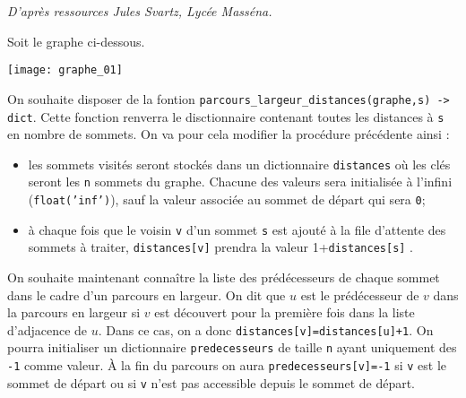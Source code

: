 \begin{flushright}
\textit{D'après ressources Jules Svartz, Lycée Masséna.}
\end{flushright}

Soit le graphe ci-dessous. 

\begin{center}
\texttt{[image: graphe\_01]}
\end{center}



%

On souhaite disposer de la fontion  \texttt{parcours\_largeur\_distances(graphe,s) -> dict}. Cette fonction renverra le disctionnaire contenant toutes les distances à \texttt{s} en nombre de sommets. On va pour cela modifier la procédure précédente ainsi :
\begin{itemize}
\item  les sommets visités seront stockés dans un dictionnaire \texttt{distances} où les clés seront les \texttt{n} sommets du graphe. Chacune des valeurs sera initialisée à l'infini (\texttt{float('inf')}), sauf la valeur associée au sommet de départ qui sera \texttt{0};
\item à chaque fois que le voisin \texttt{v} d'un sommet \texttt{s} est ajouté à la file d'attente des sommets à traiter, \texttt{distances[v]} prendra la valeur 1+\texttt{distances[s]} .
\end{itemize}

On souhaite maintenant connaître la liste des prédécesseurs de chaque sommet dans le cadre d'un parcours en largeur. On dit que $u$ est le prédécesseur de $v$ dans la parcours en largeur si $v$ est découvert pour la première fois dans la liste d'adjacence de $u$. Dans ce cas, on a donc \texttt{distances[v]=distances[u]+1}.  On pourra initialiser un dictionnaire  \texttt{predecesseurs} de taille \texttt{n} ayant uniquement des \texttt{-1} comme valeur. À la fin du parcours on aura \texttt{predecesseurs[v]=-1} si \texttt{v} est le sommet de départ ou si \texttt{v} n'est pas accessible depuis le sommet de départ. 

